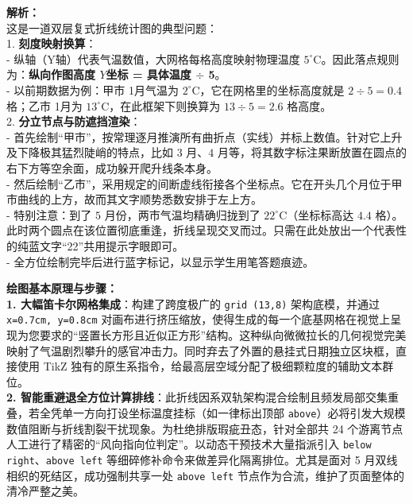 \vspace{0.8cm}

{\small\color{gray}
\textbf{解析：}\\
这是一道双层复式折线统计图的典型问题：\\
1. \textbf{刻度映射换算}：\\
- 纵轴（Y轴）代表气温数值，大网格每格高度映射物理温度 $5^\circ$C。因此落点规则为：\textbf{纵向作图高度 $Y$坐标 = 具体温度 $\div$ 5}。\\
- 以前期数据为例：甲市 1月气温为 $2^\circ$C，它在网格里的坐标高度就是 $2 \div 5 = 0.4$ 格；乙市 1月为 $13^\circ$C，在此框架下则换算为 $13 \div 5 = 2.6$ 格高度。\\
2. \textbf{分立节点与防遮挡渲染}：\\
- 首先绘制“甲市”，按常理逐月推演所有曲折点（实线）并标上数值。针对它上升及下降极其猛烈陡峭的特点，比如 $3$ 月、$4$ 月等，将其数字标注果断放置在圆点的右下方等空余面，成功躲开爬升线条本身。\\
- 然后绘制“乙市”，采用规定的间断虚线衔接各个坐标点。它在开头几个月位于甲市曲线的上方，故而其文字顺势悉数安排于左上方。\\
- 特别注意：到了 $5$ 月份，两市气温均精确归拢到了 $22^\circ$C（坐标标高达 $4.4$ 格）。此时两个圆点在该位置彻底重逢，折线呈现交叉而过。只需在此处放出一个代表性的纯蓝文字“22”共用提示字眼即可。\\
- 全方位绘制完毕后进行蓝字标记，以显示学生用笔答题痕迹。
}

\vspace{0.6cm}

{\small\color{blue!70!black}
\textbf{绘图基本原理与步骤：}\\
\textbf{1. 大幅笛卡尔网格集成}：构建了跨度极广的 \texttt{grid (13,8)} 架构底模，并通过 \texttt{x=0.7cm, y=0.8cm} 对画布进行挤压缩放，使得生成的每一个底基网格在视觉上呈现为您要求的“竖置长方形且近似正方形”结构。这种纵向微微拉长的几何视觉完美映射了气温剧烈攀升的感官冲击力。同时弃去了外置的悬挂式日期独立区块框，直接使用 TikZ 独有的原生系指令，给最高层空域分配了极细颗粒度的辅助文本群位。\\
\textbf{2. 智能重避退全方位计算排线}：此折线因系双轨架构混合绘制且频发局部交集重叠，若全凭单一方向打设坐标温度挂标（如一律标出顶部 \texttt{above}）必将引发大规模数值阻断与折线割裂干扰现象。为杜绝排版瑕疵丑态，针对全部共 24 个游离节点人工进行了精密的“风向指向位判定”。以动态干预技术大量指派引入 \texttt{below right}、\texttt{above left} 等细碎修补命令来做差异化隔离排位。尤其是面对 5 月双线相织的死结区，成功强制共享一处 \texttt{above left} 节点作为合流，维护了页面整体的清冷严整之美。
}

